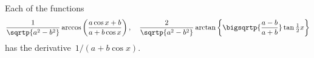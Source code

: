 Each of the functions
\[
\frac{1}{\sqrtp{a^{2} - b^{2}}}
  \arccos \left(\frac{a\cos x + b}{a + b\cos x}\right),\quad
\frac{2}{\sqrtp{a^{2} - b^{2}}}
  \arctan \left\{\bigsqrtp{\frac{a - b}{a + b }} \tan \tfrac{1}{2}x\right\}
\]
has the derivative~$1/(a + b\cos x)$.

